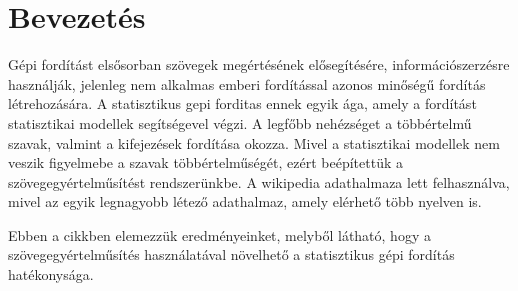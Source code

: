 \section{Bevezetés}
Gépi fordítást elsősorban szövegek megértésének elősegítésére, információszerzésre használják, jelenleg nem alkalmas emberi fordítással azonos minőségű fordítás létrehozására. A statisztikus gepi forditas ennek egyik ága, amely a fordítást statisztikai modellek segítségevel végzi.
A legfőbb nehézséget a többértelmű szavak, valmint a kifejezések fordítása okozza. Mivel a statisztikai modellek nem veszik figyelmebe a szavak többértelműségét, ezért beépítettük a szövegegyértelműsítést rendszerünkbe. A wikipedia adathalmaza lett felhasználva, mivel az egyik legnagyobb létező adathalmaz, amely elérhető több nyelven is. 

Ebben a cikkben elemezzük eredményeinket, melyből látható, hogy a szövegegyértelműsítés használatával növelhető a statisztikus gépi fordítás hatékonysága.